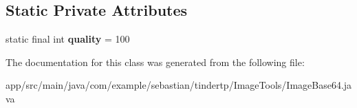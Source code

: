 \subsection*{Static Private Attributes}
\begin{DoxyCompactItemize}
\item 
static final int {\bfseries quality} = 100\hypertarget{classcom_1_1example_1_1sebastian_1_1tindertp_1_1ImageTools_1_1ImageBase64_af6a32385230c213f40649e5bb220c95c}{}\label{classcom_1_1example_1_1sebastian_1_1tindertp_1_1ImageTools_1_1ImageBase64_af6a32385230c213f40649e5bb220c95c}

\end{DoxyCompactItemize}


The documentation for this class was generated from the following file\+:\begin{DoxyCompactItemize}
\item 
app/src/main/java/com/example/sebastian/tindertp/\+Image\+Tools/Image\+Base64.\+java\end{DoxyCompactItemize}
